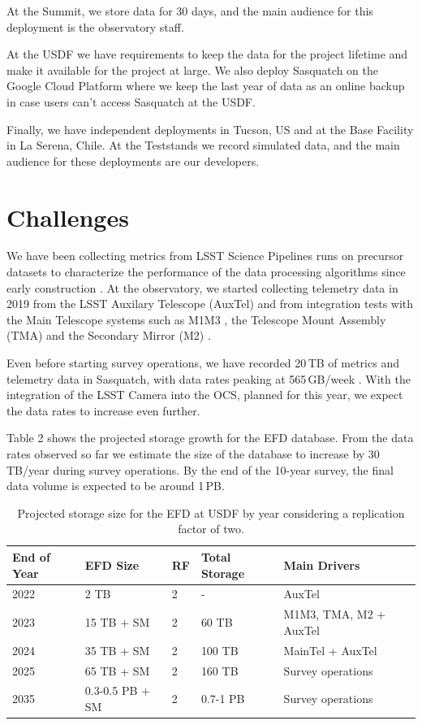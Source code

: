 At the Summit, we store data for 30 days, and the main audience for this deployment is the observatory staff.

At the USDF we have requirements to keep the data for the project lifetime and make it available for the project at large. We also deploy Sasquatch on the Google Cloud Platform where we keep the last year of data as an online backup in case users can't access Sasquatch at the USDF.

Finally, we have independent deployments in Tucson, US and at the Base Facility in La Serena, Chile. At the Teststands we record simulated data, and the main audience for these deployments are our developers.

\section{Challenges}
\label{sec:challenges}

We have been collecting metrics from LSST Science Pipelines runs on precursor datasets to characterize the performance of the data processing algorithms since early construction \cite{DMTN-091,2022SPIE12189E..0MG}. At the observatory, we started collecting telemetry data in 2019 from the LSST Auxilary Telescope (AuxTel) and from integration tests with the Main Telescope systems such as M1M3 \cite{SITCOMTN-088}, the Telescope Mount Assembly (TMA) \cite{SITCOMTN-121} and the Secondary Mirror (M2) \cite{SITCOMTN-120}.

Even before starting survey operations, we have recorded 20\,TB of metrics and telemetry data in Sasquatch, with data rates peaking at 565\,GB/week \cite{SQR-085}. With the integration of the LSST Camera into the OCS, planned for this year, we expect the data rates to increase even further.

Table 2 shows the projected storage growth for the EFD database. From the data rates observed so far we estimate the size of the database to increase by 30\,TB/year during survey operations. By the end of the 10-year survey, the final data volume is expected to be around 1\,PB.

\begin{table}[ht]
    \centering
    \caption{Projected storage size for the EFD at USDF by year considering a replication factor of two.}
    \begin{tabular}{@{}lllll@{}}
        \toprule
        \textbf{End of Year} & \textbf{EFD Size} & \textbf{RF} & \textbf{Total Storage} & \textbf{Main Drivers} \\
        \midrule
        2022 & 2 TB & 2 & - & AuxTel \\
        2023 & 15 TB + SM & 2 & 60 TB & M1M3, TMA, M2 + AuxTel \\
        2024 & 35 TB + SM & 2 & 100 TB & MainTel + AuxTel \\
        2025 & 65 TB + SM & 2 & 160 TB & Survey operations \\
        2035 & 0.3-0.5 PB + SM & 2 & 0.7-1 PB & Survey operations \\
        \bottomrule
    \end{tabular}
\end{table}

